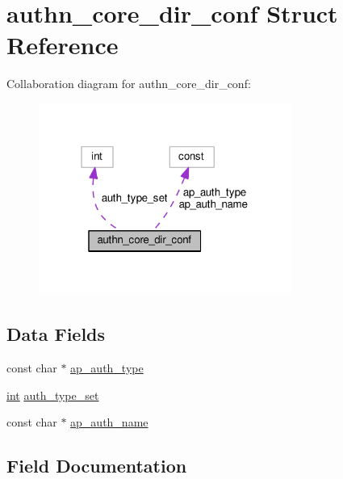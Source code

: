 \hypertarget{structauthn__core__dir__conf}{}\section{authn\+\_\+core\+\_\+dir\+\_\+conf Struct Reference}
\label{structauthn__core__dir__conf}


Collaboration diagram for authn\+\_\+core\+\_\+dir\+\_\+conf\+:
\nopagebreak
\begin{figure}[H]
\begin{center}
\leavevmode
\includegraphics[width=235pt]{structauthn__core__dir__conf__coll__graph}
\end{center}
\end{figure}
\subsection*{Data Fields}
\begin{DoxyCompactItemize}
\item 
const char $\ast$ \hyperlink{structauthn__core__dir__conf_aebea385736fd41ea26a6b19e598cc089}{ap\+\_\+auth\+\_\+type}
\item 
\hyperlink{pcre_8txt_a42dfa4ff673c82d8efe7144098fbc198}{int} \hyperlink{structauthn__core__dir__conf_a76b23000c23e867a4877020207322c6a}{auth\+\_\+type\+\_\+set}
\item 
const char $\ast$ \hyperlink{structauthn__core__dir__conf_a67bb6e403a07e6b7b1a1dd1f3faa7d5b}{ap\+\_\+auth\+\_\+name}
\end{DoxyCompactItemize}


\subsection{Field Documentation}
